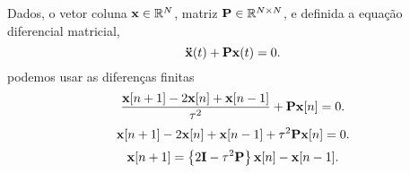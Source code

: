 \begin{myproofT}\label{proof:theo:differential-eq-discreto:order2:0}
Dados, o vetor coluna $\VECTOR{x} \in \mathbb{R}^N$, matriz $\MATRIX{P} \in \mathbb{R}^{N\times N}$, 
e definida a equação diferencial matricial,
\begin{equation}\label{eq:theo:firstorder:1}
\DDTVECTOR{x}(t) + \MATRIX{P} \VECTOR{x}(t)=0.
\end{equation}
podemos usar as diferenças finitas
\begin{equation}
\frac{\VECTOR{x}[n+1]-2\VECTOR{x}[n]+ \VECTOR{x}[n-1]}{\ToS^2} + \MATRIX{P} \VECTOR{x}[n]=0.
\end{equation}
\begin{equation}
\VECTOR{x}[n+1]-2\VECTOR{x}[n]+ \VECTOR{x}[n-1]  + \ToS^2 \MATRIX{P} \VECTOR{x}[n]=0.
\end{equation}
\begin{equation}
\VECTOR{x}[n+1]  =\left\{2\MATRIX{I}- \ToS^2 \MATRIX{P} \right\}\VECTOR{x}[n] - \VECTOR{x}[n-1].
\end{equation}
\end{myproofT}


